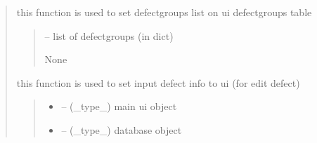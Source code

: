 \documentclass[letterpaper,10pt,english]{sphinxmanual}
\begin{document}
\begin{quote}
\begin{savenotes}\begin{fulllineitems}
\label{\detokenize{setting/backend/defect_management_funcs:oxin.backend.defect_management_funcs.set_defect_groups_on_ui}}
\pysigstartsignatures
{}
\pysigstopsignatures
\sphinxAtStartPar
this function is used to set defect\sphinxhyphen{}groups list on ui defect\sphinxhyphen{}groups table
\begin{quote}\begin{description}
\sphinxAtStartPar
{} – list of defect\sphinxhyphen{}groups (in dict)

\sphinxAtStartPar
None

\end{description}\end{quote}

\end{fulllineitems}\end{savenotes}


\begin{savenotes}\begin{fulllineitems}
\label{\detokenize{setting/backend/defect_management_funcs:oxin.backend.defect_management_funcs.set_defect_info_on_ui}}
\pysigstartsignatures
{}
\pysigstopsignatures
\sphinxAtStartPar
this function is used to set input defect info to ui (for edit defect)
\begin{quote}\begin{description}
\begin{itemize}
\item {} 
\sphinxAtStartPar
{} – (\_type\_) main ui object

\item {} 
\sphinxAtStartPar
{} – (\_type\_) database object


\end{itemize}
\end{description}
\end{quote}
\end{fulllineitems}
\end{savenotes}
\end{quote}
\end{document}
